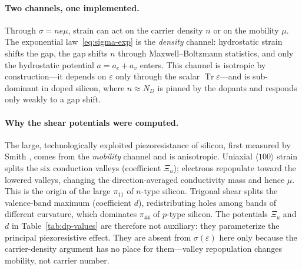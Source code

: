 \paragraph{Two channels, one implemented.}
Through $\sigma = n e \mu$, strain can act on the carrier density $n$ or on the
mobility $\mu$. The exponential law~\eqref{eq:sigma-exp} is the \emph{density}
channel: hydrostatic strain shifts the gap, the gap shifts $n$ through
Maxwell--Boltzmann statistics, and only the hydrostatic potential $a=a_c+a_v$
enters. This channel is isotropic by construction---it depends on $\varepsilon$
only through the scalar $\operatorname{Tr}\varepsilon$---and is sub-dominant in
doped silicon, where $n\approx N_D$ is pinned by the dopants and responds only
weakly to a gap shift.

\paragraph{Why the shear potentials were computed.}
The large, technologically exploited piezoresistance of silicon, first measured
by Smith \cite{smith1954}, comes from the \emph{mobility} channel and is anisotropic.
Uniaxial $\langle100\rangle$ strain splits the six conduction valleys (coefficient
$\Xi_u$); electrons repopulate toward the lowered valleys, changing the
direction-averaged conductivity mass and hence $\mu$. This is the origin of the
large $\pi_{11}$ of $n$-type silicon. Trigonal shear splits the valence-band
maximum (coefficient $d$), redistributing holes among bands of different
curvature, which dominates $\pi_{44}$ of $p$-type silicon. The potentials $\Xi_u$
and $d$ in Table~\ref{tab:dp-values} are therefore not auxiliary: they
parameterize the principal piezoresistive effect. They are absent from
$\sigma(\varepsilon)$ here only because the carrier-density argument has no place
for them---valley repopulation changes mobility, not carrier number.

